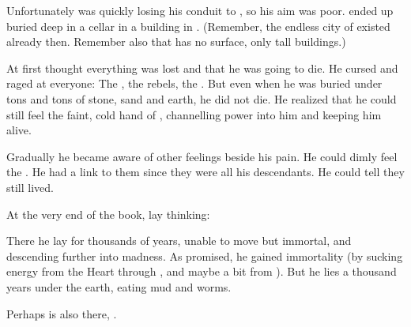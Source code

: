 Unfortunately \Daggerrain{} was quickly losing his conduit to \Tembrae, so his aim was poor. 
\Semiza{} ended up buried deep in a cellar in a building in \Nyx. 
(Remember, the endless city of \Nyx{} existed already then. 
 Remember also that \Nyx{} has no surface, only tall buildings.) 


At first \Semiza{} thought everything was lost and that he was going to die. 
He cursed and raged at everyone: 
The \dragons, the rebels, the \banes. 
But even when he was buried under tons and tons of stone, sand and earth, he did not die. 
He realized that he could still feel the faint, cold hand of \Daggerrain{}, channelling power into him and keeping him alive. 

\begin{prose}
\end{prose}

Gradually he became aware of other feelings beside his pain. 
He could dimly feel the \resphain. 
He had a link to them since they were all his descendants. 
He could tell they still lived. 

At the very end of the book, \Semiza{} lay thinking: 
\begin{prose}
\end{prose}


There he lay for thousands of years, unable to move but immortal, and descending further into madness. 
As \Daggerrain{} promised, he gained immortality (by sucking energy from the Heart through \Nyx, and maybe a bit from \Erebos). 
But he lies a thousand years under the earth, eating mud and worms. 

Perhaps \Eshayzal{} is also there, . 























